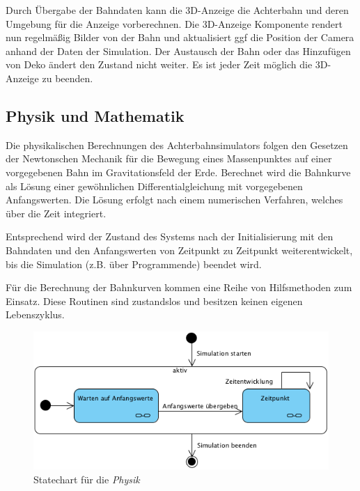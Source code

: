 Durch Übergabe der Bahndaten kann die 3D-Anzeige die Achterbahn und deren Umgebung für die Anzeige vorberechnen.
Die 3D-Anzeige Komponente rendert nun regelmäßig Bilder von der Bahn und aktualisiert ggf die Position der Camera anhand der Daten 
der Simulation. Der Austausch der Bahn oder das Hinzufügen von Deko ändert den Zustand nicht weiter.
Es ist jeder Zeit möglich die 3D-Anzeige zu beenden.

\subsection{Physik und Mathematik}

Die physikalischen Berechnungen des Achterbahnsimulators folgen den Gesetzen der Newtonschen Mechanik für die Bewegung
eines Massenpunktes auf einer vorgegebenen Bahn im Gravitationsfeld der Erde. Berechnet wird die Bahnkurve als Lösung
einer gewöhnlichen Differentialgleichung mit vorgegebenen Anfangswerten. Die Lösung erfolgt nach einem numerischen
Verfahren, welches über die Zeit integriert.

Entsprechend wird der Zustand des Systems nach der Initialisierung mit den Bahndaten und den Anfangswerten von Zeitpunkt
zu Zeitpunkt weiterentwickelt, bis die Simulation (z.B. über Programmende) beendet wird.

Für die Berechnung der Bahnkurven kommen eine Reihe von Hilfsmethoden zum Einsatz. Diese Routinen sind zustandslos und
besitzen keinen eigenen Lebenszyklus.

\begin{figure}
\includegraphics[width=\linewidth]{bilder/StateChart_physics}
\caption{Statechart für die \textit{Physik}}
\end{figure}
